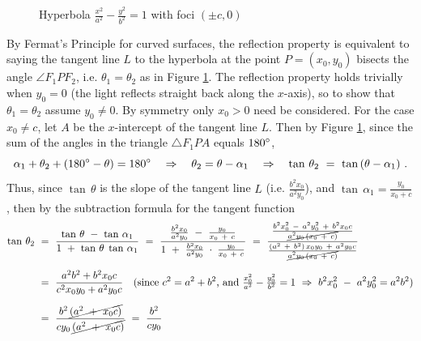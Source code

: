 \begin{figure}[h]
\begin{minipage}[b]{8.5cm}
\begin{center}
\vspace{-4mm}
 \end{center}
 \caption[]{\enskip Hyperbola $\frac{x^2}{a^2} - \frac{y^2}{b^2} = 1$ with foci $(\pm c,0)$}
 \label{fig:hyperreflpt1}
\end{minipage}
\end{figure}\vspace{-2mm}
By Fermat's Principle for curved surfaces, the reflection property is equivalent
to saying the tangent line $L$ to the hyperbola at the point $P=(x_0,y_0)$
bisects the angle $\angle F_1PF_2$, i.e. $\theta_1=\theta_2$ as in Figure
\ref{fig:hyperreflpt1}. The reflection property holds trivially when $y_0=0$
(the light reflects straight back along the $x$-axis), so to show that
$\theta_1=\theta_2$ assume $y_0 \ne 0$. By symmetry only $x_0 > 0$ need be
considered. For the case $x_0 \ne c$, let $A$ be the $x$-intercept of the
tangent line $L$. Then by Figure \ref{fig:hyperreflpt1}, since the sum of the
angles in the triangle $\triangle F_1PA$ equals $180^\circ$,
\[
\alpha_1 + \theta_2 + (180^\circ -\theta) = 180^\circ \quad\Rightarrow\quad
\theta_2 = \theta - \alpha_1 \quad\Rightarrow\quad
\tan\,\theta_2 ~=~ \tan\,(\theta - \alpha_1) ~.
\]
Thus, since $\tan\,\theta$ is the slope of the tangent line $L$ (i.e.
$\frac{b^2x_0}{a^2y_0}$), and $\tan\,\alpha_1 = \frac{y_0}{x_0 + c}$, then by
the subtraction formula for the tangent function
\begin{align*}
\tan\,\theta_2 ~&=~ \frac{\tan\,\theta ~-~ \tan\,\alpha_1}{1 ~+~ \tan\,\theta\;\tan\,\alpha_1} ~=~
 \frac{\frac{b^2x_0}{a^2y_0} ~-~ \frac{y_0}{x_0 ~+~ c}}{1 ~+~
 \frac{b^2x_0}{a^2y_0}\;\cdot\;\frac{y_0}{x_0 ~+~ c}} ~=~
 \frac{\frac{b^2 x_0^2 ~-~ a^2 y_0^2 ~+~ b^2 x_0 c}{\cancel{a^2 y_0\,(x_0 ~+~
  c)}}}{\frac{(a^2 ~+~ b^2)\,x_0 y_0 ~+~ a^2 y_0 c}{\cancel{a^2 y_0\,(x_0 ~+~ c)}}}\\[6pt]
&=~ \frac{a^2 b^2 + b^2 x_0 c}{c^2 x_0 y_0 + a^2 y_0 c}
 \quad\text{(since $c^2 = a^2 + b^2$, and $\tfrac{x_0^2}{a^2} - \tfrac{y_0^2}{b^2} = 1 ~\Rightarrow~
  b^2 x_0^2 ~-~ a^2 y_0^2 = a^2 b^2$)}\\[6pt]
&=~ \frac{b^2 \,\cancel{(a^2 ~+~ x_0 c)}}{cy_0\,\cancel{(a^2 ~+~ x_0 c)}} ~=~ \frac{b^2}{cy_0}
\end{align*}
